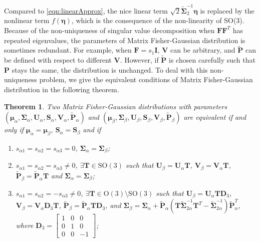 \documentclass[12pt]{article}
\newtheorem{theorem}{Theorem}
\begin{document}
Compared to \eqref{eqn:linearApprox}, the nice linear term $\sqrt{2}\tilde{\mathbf{\Sigma}}_2^{-1}\bm{\eta}$ is replaced by the nonlinear term $f(\bm{\eta})$, which is the consequence of the non-linearity of SO(3).
Because of the non-uniqueness of singular value decomposition when $\mathbf{F}\mathbf{F}^T$ has repeated eigenvalues, the parameters of Matrix Fisher-Gaussian distribution is sometimes redundant.
For example, when $\mathbf{F} = s_1\mathbf{I}$, $\mathbf{V}$ can be arbitrary, and $\tilde{\mathbf{P}}$ can be defined with respect to different $\mathbf{V}$.
However, if $\tilde{\mathbf{P}}$ is chosen carefully such that $\mathbf{P}$ stays the same, the distribution is unchanged.
To deal with this non-uniqueness problem, we give the equivalent conditions of Matrix Fisher-Gaussian distribution in the following theorem.
\begin{theorem} \label{thm:Equivalence}
	Two Matrix Fisher-Gaussian distributions with parameters $(\bm{\mu}_\alpha, \mathbf{\Sigma}_\alpha, \mathbf{U}_\alpha, \mathbf{S}_\alpha, \mathbf{V}_\alpha, \mathbf{\tilde{P}}_\alpha)$ and $(\bm{\mu}_\beta, \mathbf{\Sigma}_\beta, \mathbf{U}_\beta, \mathbf{S}_\beta, \mathbf{V}_\beta, \mathbf{\tilde{P}}_\beta)$ are equivalent if and only if $\bm{\mu}_\alpha=\bm{\mu}_\beta$, $\mathbf{S}_\alpha=\mathbf{S}_\beta$ and if
	\begin{enumerate}
		\item $s_{\alpha 1}=s_{\alpha 2}=s_{\alpha 3}=0$, $\mathbf{\Sigma}_\alpha=\mathbf{\Sigma}_\beta$;
		\item $s_{\alpha 1}=s_{\alpha 2}=s_{\alpha 3}\neq 0$, $\exists\mathbf{T}\in\mathrm{SO}(3)$ such that $\mathbf{U}_\beta=\mathbf{U}_\alpha\mathbf{T}$, $\mathbf{V}_\beta=\mathbf{V}_\alpha\mathbf{T}$, $\tilde{\mathbf{P}}_\beta=\tilde{\mathbf{P}}_\alpha\mathbf{T}$ and $\mathbf{\Sigma}_\alpha=\mathbf{\Sigma}_\beta$;
		\item $s_{\alpha 1}=s_{\alpha 2}=-s_{\alpha 3}\neq 0$, $\exists\mathbf{T}\in\mathrm{O}(3)\setminus\mathrm{SO}(3)$ such that $\mathbf{U}_\beta=\mathbf{U}_\alpha\mathbf{T}\mathbf{D}_3$, $\mathbf{V}_\beta=\mathbf{V}_\alpha\mathbf{D}_3\mathbf{T}$, $\tilde{\mathbf{P}}_\beta=\tilde{\mathbf{P}}_\alpha\mathbf{T}\mathbf{D}_3$, and $\mathbf{\Sigma}_\beta=\mathbf{\Sigma}_\alpha+\tilde{\mathbf{P}}_\alpha\left(\mathbf{T}\tilde{\mathbf{\Sigma}}_{2\alpha}^{-1}\mathbf{T}^T-\tilde{\mathbf{\Sigma}}_{2\alpha}^{-1}\right)\tilde{\mathbf{P}}_\alpha^T$, where $\mathbf{D}_3=\begin{bmatrix}1&0&0\\0&1&0\\0&0&-1\end{bmatrix}$;

\end{enumerate}
\end{theorem}
\end{document}
